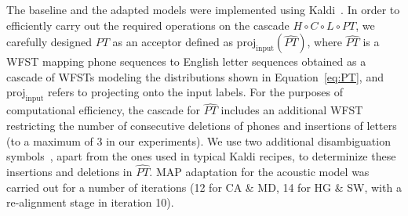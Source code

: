 The baseline and the adapted models were implemented using Kaldi~\cite{Kaldi2011}. In order to efficiently carry out the required operations on the cascade $H \circ C \circ L \circ PT$, we carefully designed $PT$ as an acceptor defined as $\mathrm{proj}_{\mathrm{input}} (\widehat{PT})$, where $\widehat{PT}$ is a WFST mapping phone sequences to English letter sequences obtained as a cascade of WFSTs modeling the distributions shown in Equation~\ref{eq:PT}, and $\mathrm{proj}_{\mathrm{input}}$ refers to projecting onto the input labels. For the purposes of computational efficiency, the cascade for $\widehat{PT}$ includes an additional WFST restricting the number of consecutive deletions of phones and insertions of letters (to a maximum of 3 in our experiments). We use two additional disambiguation symbols~\cite{mohri2008speech}, apart from the ones used in typical Kaldi recipes, to determinize these insertions and deletions in $\widehat{PT}$. MAP adaptation for the acoustic model was carried out for a number of iterations (12 for CA \& MD, 14 for HG \& SW, with a re-alignment stage in iteration 10).

